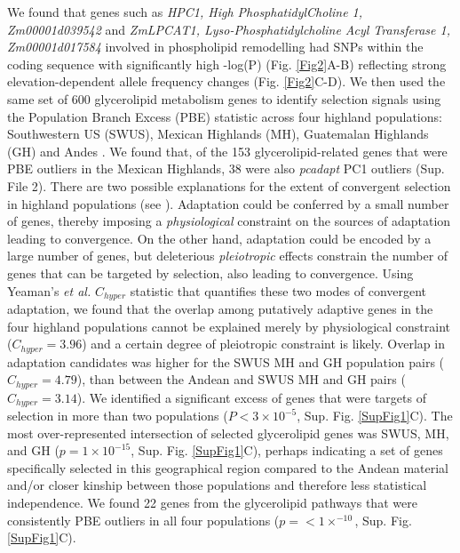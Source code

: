 \documentclass[9pt,twocolumn,twoside,lineno]{BioRxiv}
\begin{document}
We found that genes such as \textit{HPC1, High PhosphatidylCholine 1, Zm00001d039542} and \textit{ZmLPCAT1, Lyso-Phosphatidylcholine Acyl Transferase 1, Zm00001d017584} involved in phospholipid remodelling had SNPs within the coding sequence with significantly high -log(P) (Fig. \ref{Fig2}A-B) reflecting strong elevation-dependent allele frequency changes (Fig. \ref{Fig2}C-D). 
We then used the same set of 600 glycerolipid metabolism genes to identify selection signals using the Population Branch Excess (PBE) \cite{Pool2017-oa} statistic across four highland populations: Southwestern US (SWUS), Mexican Highlands (MH), Guatemalan Highlands (GH) and Andes \cite{Wang2020-mp}.
We found that, of the 153 glycerolipid-related genes that were PBE outliers in the Mexican Highlands, 38 were also \textit{pcadapt} PC1 outliers (Sup. File 2).
There are two possible explanations for the extent of convergent selection in highland populations (see \cite{Wang2020-mp, yeaman2018}). 
Adaptation could be conferred by a small number of genes, thereby imposing a \textit{physiological} constraint on the sources of adaptation leading to convergence. 
On the other hand, adaptation could be encoded by a large number of genes, but deleterious \textit{pleiotropic} effects constrain the number of genes that can be targeted by selection, also leading to convergence.  
Using Yeaman's \textit{et al.} $C_{hyper}$ statistic \cite{yeaman2018} that quantifies these two modes of convergent adaptation, we found that the overlap among putatively adaptive genes in the four highland populations cannot be explained merely by physiological constraint ($C_{hyper} = 3.96$) and a certain degree of pleiotropic constraint is likely.
Overlap in adaptation candidates was higher for the SWUS MH and GH population pairs ($C_{hyper} = 4.79$), than between the Andean and SWUS MH and GH pairs ($C_{hyper} = 3.14$).
We identified a significant excess of genes that were targets of selection in more than two populations ($P< 3 \times 10^{-5}$, Sup. Fig. \ref{SupFig1}C).
The most over-represented intersection of selected glycerolipid genes was SWUS, MH, and GH ($p = 1  \times 10 ^{-15} $, Sup. Fig. \ref{SupFig1}C), perhaps indicating a set of genes specifically selected in this geographical region compared to the Andean material and/or closer kinship between those populations and therefore less statistical independence.
We found 22 genes from the glycerolipid pathways that were consistently PBE outliers in all four populations ($p =<1  \times  ^{-10}$, Sup. Fig. \ref{SupFig1}C). 
\end{document}

